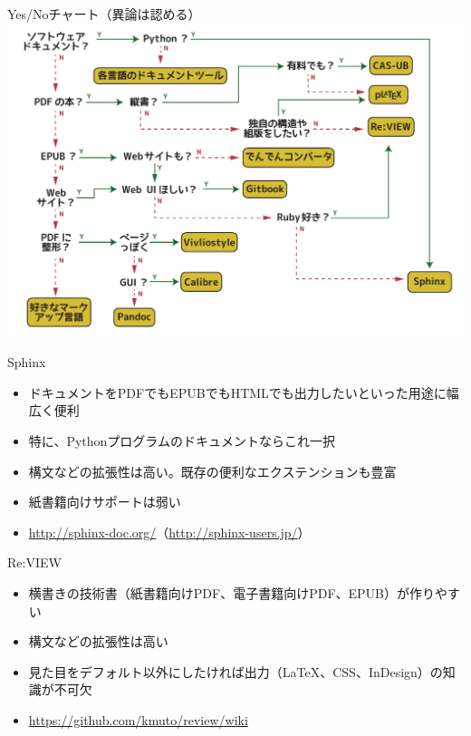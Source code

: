 \begin{frame}[containsverbatim, t]{\inhibitglue Yes/Noチャート（異論は認める）}
  \sffamily
  \includegraphics[width=.95\textwidth]{images/ynchart.pdf}
\end{frame}

\begin{frame}[containsverbatim, t]{\inhibitglue Sphinx}
  \sffamily
  
  \begin{itemize}
    \item ドキュメントをPDFでもEPUBでもHTMLでも出力したいといった用途に幅広く便利
    \item 特に、Pythonプログラムのドキュメントならこれ一択
    \item 構文などの拡張性は高い。既存の便利なエクステンションも豊富
    \item 紙書籍向けサポートは弱い
    \item \url{http://sphinx-doc.org/}（\url{http://sphinx-users.jp/}）
  \end{itemize}

\end{frame}

\begin{frame}[containsverbatim, t]{\inhibitglue Re:VIEW}
  \sffamily
  
  \begin{itemize}
    \item 横書きの技術書（紙書籍向けPDF、電子書籍向けPDF、EPUB）が作りやすい
    \item 構文などの拡張性は高い
    \item 見た目をデフォルト以外にしたければ出力（LaTeX、CSS、InDesign）の知識が不可欠
    \item \url{https://github.com/kmuto/review/wiki}
  \end{itemize}

\end{frame}


